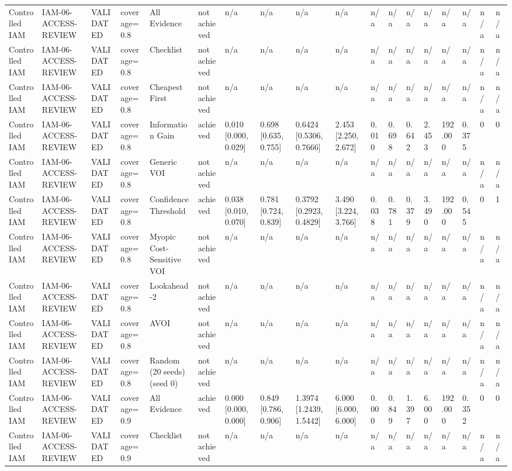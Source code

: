 \begin{table}[!ht]
{\begin{tabular}{llllllllllllllllll}
Controlled IAM & IAM-06-ACCESS-REVIEW & VALIDATED & coverage=0.8 & All Evidence & not achieved & n/a & n/a & n/a & n/a & n/a & n/a & n/a & n/a & n/a & n/a & n/a & n/a \\
Controlled IAM & IAM-06-ACCESS-REVIEW & VALIDATED & coverage=0.8 & Checklist & not achieved & n/a & n/a & n/a & n/a & n/a & n/a & n/a & n/a & n/a & n/a & n/a & n/a \\
Controlled IAM & IAM-06-ACCESS-REVIEW & VALIDATED & coverage=0.8 & Cheapest First & not achieved & n/a & n/a & n/a & n/a & n/a & n/a & n/a & n/a & n/a & n/a & n/a & n/a \\
Controlled IAM & IAM-06-ACCESS-REVIEW & VALIDATED & coverage=0.8 & Information Gain & achieved & 0.010 [0.000, 0.029] & 0.698 [0.635, 0.755] & 0.6424 [0.5306, 0.7666] & 2.453 [2.250, 2.672] & 0.010 & 0.698 & 0.642 & 2.453 & 192.000 & 0.375 & 0 & 0 \\
Controlled IAM & IAM-06-ACCESS-REVIEW & VALIDATED & coverage=0.8 & Generic VOI & not achieved & n/a & n/a & n/a & n/a & n/a & n/a & n/a & n/a & n/a & n/a & n/a & n/a \\
Controlled IAM & IAM-06-ACCESS-REVIEW & VALIDATED & coverage=0.8 & Confidence Threshold & achieved & 0.038 [0.010, 0.070] & 0.781 [0.724, 0.839] & 0.3792 [0.2923, 0.4829] & 3.490 [3.224, 3.766] & 0.038 & 0.781 & 0.379 & 3.490 & 192.000 & 0.545 & 0 & 1 \\
Controlled IAM & IAM-06-ACCESS-REVIEW & VALIDATED & coverage=0.8 & Myopic Cost-Sensitive VOI & not achieved & n/a & n/a & n/a & n/a & n/a & n/a & n/a & n/a & n/a & n/a & n/a & n/a \\
Controlled IAM & IAM-06-ACCESS-REVIEW & VALIDATED & coverage=0.8 & Lookahead-2 & not achieved & n/a & n/a & n/a & n/a & n/a & n/a & n/a & n/a & n/a & n/a & n/a & n/a \\
Controlled IAM & IAM-06-ACCESS-REVIEW & VALIDATED & coverage=0.8 & AVOI & not achieved & n/a & n/a & n/a & n/a & n/a & n/a & n/a & n/a & n/a & n/a & n/a & n/a \\
Controlled IAM & IAM-06-ACCESS-REVIEW & VALIDATED & coverage=0.8 & Random (20 seeds) (seed 0) & not achieved & n/a & n/a & n/a & n/a & n/a & n/a & n/a & n/a & n/a & n/a & n/a & n/a \\
Controlled IAM & IAM-06-ACCESS-REVIEW & VALIDATED & coverage=0.9 & All Evidence & achieved & 0.000 [0.000, 0.000] & 0.849 [0.786, 0.906] & 1.3974 [1.2439, 1.5442] & 6.000 [6.000, 6.000] & 0.000 & 0.849 & 1.397 & 6.000 & 192.000 & 0.352 & 0 & 0 \\
Controlled IAM & IAM-06-ACCESS-REVIEW & VALIDATED & coverage=0.9 & Checklist & not achieved & n/a & n/a & n/a & n/a & n/a & n/a & n/a & n/a & n/a & n/a & n/a & n/a \\

\end{tabular}}
\end{table}
